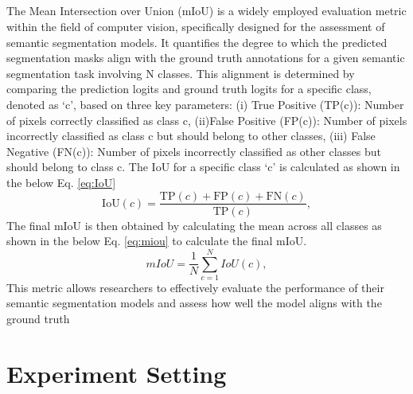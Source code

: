 \subsection{\mIoU}
The Mean Intersection over Union (mIoU) is a widely employed evaluation metric within the field of computer vision, specifically designed for the assessment of semantic segmentation models. It quantifies the degree to which the predicted segmentation masks align with the ground truth annotations for a given semantic segmentation task involving N classes. This alignment is determined by comparing the prediction logits and ground truth logits for a specific class, denoted as `c', based on three key parameters: (i) True Positive (TP(c)): Number of pixels correctly classified as class c, (ii)False Positive (FP(c)): Number of pixels incorrectly classified as class c but should belong to other classes, (iii)
False Negative (FN(c)): Number of pixels incorrectly classified as other classes but should belong to class c. The IoU for a specific class `c' is calculated as shown in the below Eq. \ref{eq:IoU}
\begin{equation}
\label{eq:IoU}
    \text{IoU}(c) = \frac{\text{TP}(c) + \text{FP}(c) + \text{FN}(c)}{\text{TP}(c)} ,
\end{equation}
The final mIoU is then obtained by calculating the mean across all classes as shown in the below Eq. \ref{eq:miou} to calculate the final mIoU.
\begin{equation}
    \label{eq:miou}
    mIoU = \frac{1}{N} \sum_{c=1}^{N} IoU(c),
\end{equation}
This metric allows researchers to effectively evaluate the performance of their semantic segmentation models and assess how well the model aligns with the ground truth


\section{Experiment Setting}
\label{sec:experiment}

